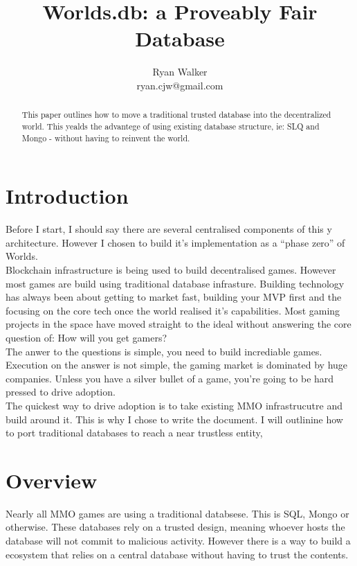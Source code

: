 \documentclass[runningheads,a4paper]{llncs}
\begin{document}
\mainmatter  %

\title{Worlds.db: a Proveably Fair Database}

\author{Ryan Walker\\
				ryan.cjw@gmail.com}

\institute{} %

\maketitle

\begin{abstract}
This paper outlines how to move a traditional trusted database into the
decentralized world. This yealds the advantege of using existing database
structure, ie: SLQ and Mongo - without having to reinvent the world.
\end{abstract}

\section{Introduction}
Before I start, I should say there are several centralised components of this
y architecture. However I chosen to build it's implementation as a ``phase zero''
of Worlds. 
\\


Blockchain infrastructure is being used to build decentralised games. However
most games are build using traditional database infrasture. Building technology
has always been about getting to market fast, building your MVP first and the
focusing on the core tech once the world realised it's capabilities. Most gaming
projects in the space have moved straight to the ideal without answering the core
question of: How will you get gamers?
\\


The anwer to the questions is simple, you need to build incrediable games. Execution
on the answer is not simple, the gaming market is dominated by huge companies. Unless
you have a silver bullet of a game, you're going to be hard pressed to drive adoption.
\\

The quickest way to drive adoption is to take existing MMO infrastrucutre and build
around it. This is why I chose to write the document. I will outlinine how to
port traditional databases to reach a near trustless entity,

\section{Overview}
Nearly all MMO games are using a traditional databsese. This is SQL, Mongo or otherwise.
These databases rely on a trusted design, meaning whoever hosts the database will not 
commit to malicious activity. However there is a way to build a ecosystem that relies
on a central database without having to trust the contents.
\\
\end{document}
